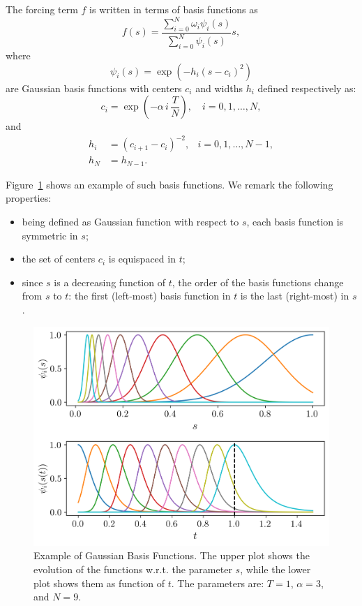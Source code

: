 \documentclass[fleqn, 11pt]{article}
\theoremstyle{definition}
\theoremstyle{plain}
\theoremstyle{remark}
\begin{document}
The forcing term $f$ is written in terms of basis functions as
\begin{equation}
    \label{eq:forcing_term}
    f (s) = \frac{ \sum_{i=0}^N \omega_i \psi_i(s) }{ \sum_{i=0}^N \psi_i(s) } s,
\end{equation}
where
\begin{equation}
    \psi_i (s) = \exp \left( {- h_i (s - c_i) ^ 2}  \right) \label{eq:gaussian_basis_def}
\end{equation}
are Gaussian basis functions with centers $c_i$ and widths $h_i$ defined respectively as:
\begin{equation}
    \label{eq:basis_centers_def}
    c_i = \exp \left( { -\alpha \, i \, \frac{T}{N} } \right)  , \quad i = 0, 1, \ldots, N,
\end{equation}
and
\begin{equation}
    \label{eq:basis_width_gaussian_def}
    \begin{aligned}
        h_i & = (c_{i+1} - c_i) ^ {-2}, & i = 0,1,\ldots, N - 1, \\
        h_{N} & = h_{N - 1}.
    \end{aligned}
\end{equation}

Figure~\ref{fig:gaus_bfs} shows an example of such basis functions.
We remark the following properties:
\begin{itemize}
    \item being defined as Gaussian function with respect to $s$, each basis function is symmetric in $ s $;
    \item the set of centers $ c_i $ is equispaced in $t$;
    \item since $ s $ is a decreasing function of $t$, the order of the basis functions change from $s$ to $t$: the first (left-most) basis function in $t$ is the last (right-most) in $s$.
\end{itemize}

\begin{figure}
    \centering
    \includegraphics[width = 0.6\linewidth]{imgs/gaussian_bfs.png}
    \caption{Example of Gaussian Basis Functions.
    The upper plot shows the evolution of the functions w.r.t. the parameter $s$, while the lower plot shows them as function of $t$.
    The parameters are: $ T = 1 $, $ \alpha = 3 $, and $ N = 9 $.}
    \label{fig:gaus_bfs}
\end{figure}
\end{document}
